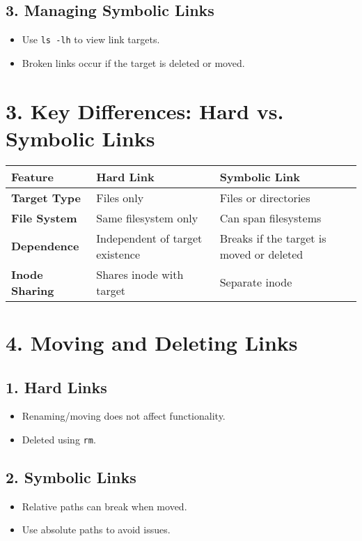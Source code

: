 \documentclass[a4paper]{report}
\begin{document}
\subsection*{3. Managing Symbolic Links}
\begin{itemize}
    \item Use \texttt{ls -lh} to view link targets.
    \item Broken links occur if the target is deleted or moved.
\end{itemize}

\section*{3. Key Differences: Hard vs. Symbolic Links}

\begin{center}
\begin{tabular}{|l|l|l|}
\hline
\textbf{Feature}          & \textbf{Hard Link}                 & \textbf{Symbolic Link}          \\ \hline
\textbf{Target Type}      & Files only                        & Files or directories            \\ \hline
\textbf{File System}      & Same filesystem only              & Can span filesystems            \\ \hline
\textbf{Dependence}       & Independent of target existence   & Breaks if the target is moved or deleted \\ \hline
\textbf{Inode Sharing}    & Shares inode with target          & Separate inode                  \\ \hline
\end{tabular}
\end{center}

\section*{4. Moving and Deleting Links}

\subsection*{1. Hard Links}
\begin{itemize}
    \item Renaming/moving does not affect functionality.
    \item Deleted using \texttt{rm}.
\end{itemize}

\subsection*{2. Symbolic Links}
\begin{itemize}
    \item Relative paths can break when moved.
    \item Use absolute paths to avoid issues.
\end{itemize}
\end{document}
